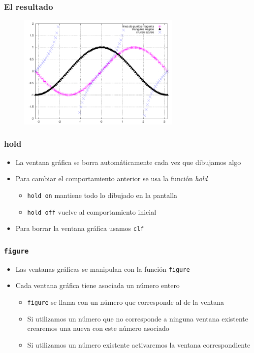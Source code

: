 \documentclass[12pt]{beamer}
\begin{document}
\begin{frame}
\frametitle{El resultado}
  \begin{figure}[h]
    \centering{}
    \includegraphics[width=8cm, keepaspectratio]{fig/trigplot.pdf}
  \end{figure}
\end{frame}

\begin{frame}
\frametitle{hold}
\begin{itemize}
\item La ventana gráfica se borra automáticamente cada vez que
  dibujamos algo
\item Para cambiar el comportamiento anterior se usa la función
  \emph{hold}
  \begin{itemize}
    \item \texttt{hold on} mantiene todo lo dibujado en la pantalla
    \item \texttt{hold off} vuelve al comportamiento inicial
  \end{itemize}
  \item Para borrar la ventana gráfica usamos \texttt{clf}
\end{itemize}
\end{frame}

\begin{frame}
\frametitle{\texttt{figure}}
\begin{itemize}
\item Las ventanas gráficas se manipulan con la función
  \texttt{figure}
\item Cada ventana gráfica tiene asociada un número entero
  \begin{itemize}
    \item \texttt{figure} se llama con un número que corresponde al de
      la ventana
    \item Si utilizamos un número que no corresponde a ninguna ventana
      existente crearemos una nueva con este número asociado
    \item Si utilizamos un número existente activaremos la ventana
      correspondiente
  \end{itemize}
\end{itemize}
\end{frame}
\end{document}
